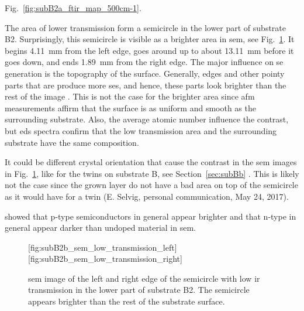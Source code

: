  Fig.~\ref{fig:subB2a_ftir_map_500cm-1}. 

The area of lower transmission form a semicircle in the lower part of substrate B2. Surprisingly, this semicircle is visible as a brighter area in \ac{sem}, see Fig.~\ref{fig:subB2b_sem_low_transmission}. It begins \SI{4.11}{\milli\metre} from the left edge, goes around up to about \SI{13.11}{\milli\metre} before it goes down, and ends \SI{1.89}{\milli\metre} from the right edge. The major influence on \ac{se} generation is the topography of the surface. Generally, edges and other pointy parts that are produce more \acp{se}, and hence, these parts look brighter than the rest of the image \citep{goldstein2012scanning}. This is not the case for the brighter area since \ac{afm} measurements affirm that the surface is as uniform and smooth as the surrounding substrate. Also, the average atomic number influence the contrast, but \ac{eds} spectra confirm that the low transmission area and the surrounding substrate have the same composition.

It could be different crystal orientation that cause the contrast in the \ac{sem} images in Fig.~\ref{fig:subB2b_sem_low_transmission}, like for the twins on substrate B, see Section~\ref{sec:subBb} . This is likely not the case since the grown layer do not have a bad area on top of the semicircle as it would have for a twin (E. Selvig, personal communication, May 24, 2017).

\citet{sealy2000mechanism} showed that p-type semiconductors in general appear brighter and that n-type in general appear darker than undoped material in \ac{sem}. 

\begin{figure}
    \centering
    [fig:subB2b_sem_low_transmission_left]
    \hfill
    [fig:subB2b_sem_low_transmission_right]
    \caption[]{\Ac{sem} image of the  left and  right edge of the semicircle with low \ac{ir} transmission in the lower part of substrate B2. The semicircle appears brighter than the rest of the substrate surface.}\label{fig:subB2b_sem_low_transmission}
\end{figure}

